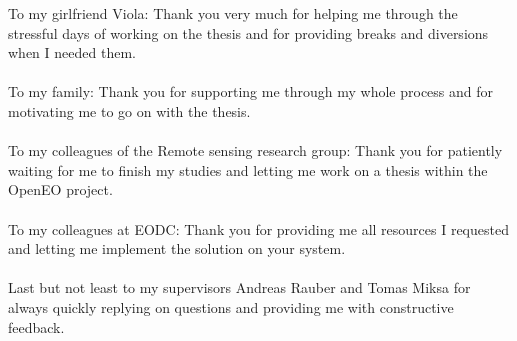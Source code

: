 \documentclass[draft,final]{vutinfth} %
\begin{document}
\frontmatter %

\addstatementpage




\begin{acknowledgements*}
To my girlfriend Viola: Thank you very much for helping me through the stressful days of working on the thesis and for providing breaks and diversions when I needed them.\\ \\
To my family: Thank you for supporting me through my whole process and for motivating me to go on with the thesis. \\ \\
To my colleagues of the Remote sensing research group: Thank you for patiently waiting for me to finish my studies and letting me work on a thesis within the OpenEO project. \\ \\
To my colleagues at EODC: Thank you for providing me all resources I requested and letting me implement the solution on your system. \\ \\
Last but not least to my supervisors Andreas Rauber and Tomas Miksa for always quickly replying on questions and providing me with constructive feedback. 
\end{acknowledgements*}
\end{document}
